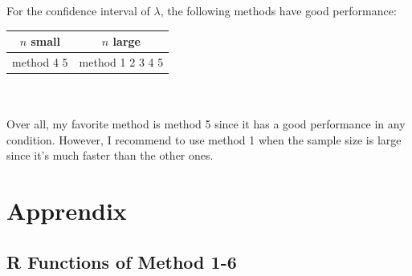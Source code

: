 \documentclass[12pt]{article}
\begin{document}
For the confidence interval of $\lambda$, the following methods have good performance:\\

\begin{tabular}{|c|c|}
\hline
  $n$ small & $n$ large\\
 \hline
method 4 5  &  method 1 2 3 4 5\\
\hline
\end{tabular}
\\
\\

Over all, my favorite method is method 5 since it has a good performance in any condition. However, I recommend to use method 1 when the sample size is large since it's much faster than the other ones. \\

\newpage

\section{Apprendix}
\subsection{R Functions of Method 1-6}

\noindent\makebox[\linewidth]{\rule{\textwidth}{1pt}}

\noindent\makebox[\linewidth]{\rule{\textwidth}{1pt}}
\end{document}
